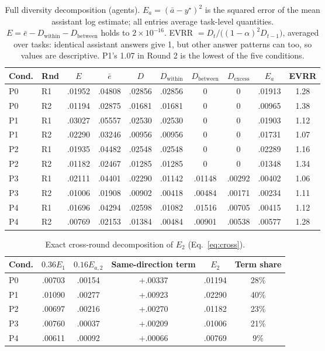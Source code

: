 \documentclass[10pt]{article}
\newenvironment{fittable}{\begin{lrbox}{\manuscripttable}}{%
\end{lrbox}\ifdim\wd\manuscripttable>\linewidth
\resizebox{\linewidth}{!}{\usebox{\manuscripttable}}%
\else\usebox{\manuscripttable}\fi}
\theoremstyle{manuscript}\newtheorem{proposition}{Proposition}
\newcommand{\Dw}{D_{\mathrm{within}}}
\newcommand{\Db}{D_{\mathrm{between}}}
\newcommand{\Dx}{D_{\mathrm{excess}}}
\begin{document}
\begin{table}[ht]\centering\small
\caption{Full diversity decomposition (agents). $E_a=(\bar a-y^\star)^2$ is the squared error of the mean assistant log estimate; all entries average task-level quantities. $E=\bar e-\Dw-\Db$ holds to $2\times10^{-16}$. EVRR $=D_t/\big((1-\alpha)^2D_{t-1}\big)$, averaged over tasks: identical assistant answers give 1, but other answer patterns can too, so values are descriptive. P1's 1.07 in Round 2 is the lowest of the five conditions.}\label{tab:div}
\begin{fittable}
\begin{tabular}{@{}llcccccccc@{}}\toprule
Cond. & Rnd & $E$ & $\bar e$ & $D$ & $\Dw$ & $\Db$ & $\Dx$ & $E_a$ & EVRR\\\midrule
P0 & R1 & .01952 & .04808 & .02856 & .02856 & 0 & 0 & .01913 & 1.28\\
P0 & R2 & .01194 & .02875 & .01681 & .01681 & 0 & 0 & .00965 & 1.38\\
P1 & R1 & .03027 & .05557 & .02530 & .02530 & 0 & 0 & .01903 & 1.12\\
P1 & R2 & .02290 & .03246 & .00956 & .00956 & 0 & 0 & .01731 & 1.07\\
P2 & R1 & .01935 & .04482 & .02548 & .02548 & 0 & 0 & .02289 & 1.16\\
P2 & R2 & .01182 & .02467 & .01285 & .01285 & 0 & 0 & .01348 & 1.34\\
P3 & R1 & .02111 & .04401 & .02290 & .01142 & .01148 & .00292 & .00402 & 1.06\\
P3 & R2 & .01006 & .01908 & .00902 & .00418 & .00484 & .00171 & .00234 & 1.11\\
P4 & R1 & .01696 & .04294 & .02598 & .01082 & .01516 & .00705 & .00415 & 1.12\\
P4 & R2 & .00769 & .02153 & .01384 & .00484 & .00901 & .00538 & .00577 & 1.28\\\bottomrule
\end{tabular}
\end{fittable}
\end{table}

\begin{table}[ht]\centering\small
\caption{Exact cross-round decomposition of $E_2$ (Eq.~\ref{eq:cross}).}\label{tab:cross}
\begin{fittable}
\begin{tabular}{@{}lcccc c@{}}\toprule
Cond. & $0.36E_1$ & $0.16E_{a,2}$ & Same-direction term & $E_2$ & Term share\\\midrule
P0 & .00703 & .00154 & +.00337 & .01194 & 28\%\\
P1 & .01090 & .00277 & +.00923 & .02290 & 40\%\\
P2 & .00697 & .00216 & +.00270 & .01182 & 23\%\\
P3 & .00760 & .00037 & +.00209 & .01006 & 21\%\\
P4 & .00611 & .00092 & +.00066 & .00769 & 9\%\\\bottomrule
\end{tabular}
\end{fittable}
\end{table}
\end{document}
